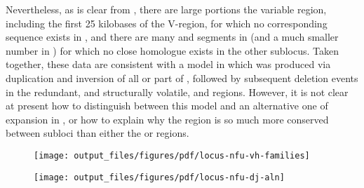 Nevertheless, as is clear from , there are large portions the  variable region, including the first 25 kilobases of the V-region, for which no corresponding sequence exists in , and there are many \vh and \dh segments in  (and a much smaller number in ) for which no close homologue exists in the other sublocus. Taken together, these data are consistent with a model in which  was produced via duplication and inversion of all or part of , followed by subsequent deletion events in the redundant, and structurally volatile,  \vh and \dh regions. However, it is not clear at present how to distinguish between this model and an alternative one of expansion in , or how to explain why the \jh region is so much more conserved between subloci than either the \vh or \dh regions.

	
	\begin{figure}
	\centering
	\begin{subfigure}{0em}
    \label{fig:nfu-vh-families-a}
    \end{subfigure}
    \begin{subfigure}{0em}
    \label{fig:nfu-vh-families-b}
    \end{subfigure}
	\texttt{[image: output\_files/figures/pdf/locus-nfu-vh-families]}
	\label{fig:nfu-vh-families}
	\end{figure}

\begin{figure}
\centering
	\centering
	\begin{subfigure}{0em}
    \label{fig:nfu-dj-alignment-a}
    \end{subfigure}
    \begin{subfigure}{0em}
    \label{fig:nfu-dj-alignment-b}
    \end{subfigure}
\texttt{[image: output\_files/figures/pdf/locus-nfu-dj-aln]}
\label{fig:nfu-dj-alignment}
\end{figure}	
	
